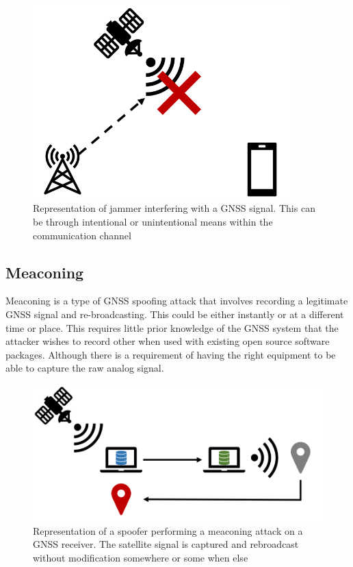 \begin{figure}[h]
    \begin{centering}
        \includegraphics[width=10cm, keepaspectratio]{Figures/Jamming.png}
        \caption{Representation of jammer interfering with a GNSS signal. This can be through intentional or unintentional means within the communication channel}
    \label{fig:jamming cartoon}
    \end{centering}
\end{figure}

\subsection{Meaconing}
Meaconing is a type of GNSS spoofing attack that involves recording a legitimate GNSS signal and re-broadcasting. This could be either instantly or at a different time or
place. This requires little prior knowledge of the GNSS system that the attacker wishes to record other when used with existing open source software packages. Although
there is a requirement of having the right equipment to be able to capture the raw analog signal.

\begin{figure}[h]
    \begin{centering}
        \includegraphics[width=12cm, keepaspectratio]{Figures/Meaconing.png}
        \caption{Representation of a spoofer performing a meaconing attack on a GNSS receiver. The satellite signal is captured and rebroadcast without modification somewhere or some when else}
    \label{fig:meaconing cartoon}
    \end{centering}
\end{figure}

